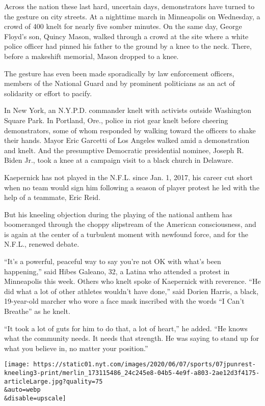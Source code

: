 Across the nation these last hard, uncertain days, demonstrators have
turned to the gesture on city streets. At a nighttime march in
Minneapolis on Wednesday, a crowd of 400 knelt for nearly five somber
minutes. On the same day, George Floyd's son, Quincy Mason, walked
through a crowd at the site where a white police officer had pinned his
father to the ground by a knee to the neck. There, before a makeshift
memorial, Mason dropped to a knee.

The gesture has even been made sporadically by law enforcement officers,
members of the National Guard and by prominent politicians as an act of
solidarity or effort to pacify.

In New York, an N.Y.P.D. commander knelt with activists outside
Washington Square Park. In Portland, Ore., police in riot gear knelt
before cheering demonstrators, some of whom responded by walking toward
the officers to shake their hands. Mayor Eric Garcetti of Los Angeles
walked amid a demonstration and knelt. And the presumptive Democratic
presidential nominee, Joseph R. Biden Jr., took a knee at a campaign
visit to a black church in Delaware.

Kaepernick has not played in the N.F.L. since Jan. 1, 2017, his career
cut short when no team would sign him following a season of player
protest he led with the help of a teammate, Eric Reid.

But his kneeling objection during the playing of the national anthem has
boomeranged through the choppy slipstream of the American consciousness,
and is again at the center of a turbulent moment with newfound force,
and for the N.F.L., renewed debate.

``It's a powerful, peaceful way to say you're not OK with what's been
happening,'' said Hibes Galeano, 32, a Latina who attended a protest in
Minneapolis this week. Others who knelt spoke of Kaepernick with
reverence. ``He did what a lot of other athletes wouldn't have done,''
said Dorien Harris, a black, 19-year-old marcher who wore a face mask
inscribed with the words ``I Can't Breathe'' as he knelt.

``It took a lot of guts for him to do that, a lot of heart,'' he added.
``He knows what the community needs. It needs that strength. He was
saying to stand up for what you believe in, no matter your position.''

\texttt{[image: https://static01.nyt.com/images/2020/06/07/sports/07jpunrest-kneeling3-print/merlin\_173115486\_24c245e8-04b5-4e9f-a803-2ae12d3f4175-articleLarge.jpg?quality=75\\\&auto=webp\\\&disable=upscale]}

